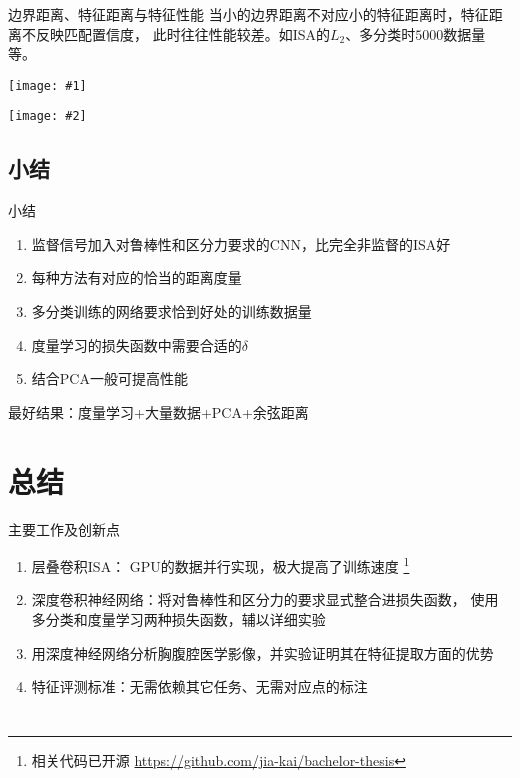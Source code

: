 \documentclass {beamer}
\newcommand{\addtwocolplot}[2]{\centering
    \begin{minipage}{0.49\textwidth}
        \centering
        \texttt{[image: \#1]}
    \end{minipage}
    \begin{minipage}{0.49\textwidth}
        \centering
        \texttt{[image: \#2]}
    \end{minipage}
}
\begin{document}
\begin{frame}{边界距离、特征距离与特征性能}
    当小的边界距离不对应小的特征距离时，特征距离不反映匹配置信度，
    此时往往性能较差。如ISA的$L_2$、多分类时$5000$数据量等。

    \vspace{1em}
    \addtwocolplot{res/expr/border-dist-stat/l2.pdf}
        {res/expr/border-dist-stat/cos.pdf}
\end{frame}

\subsection{小结}
\begin{frame}{小结}
    \begin{enumerate}
        \item 监督信号加入对鲁棒性和区分力要求的CNN，比完全非监督的ISA好
        \item 每种方法有对应的恰当的距离度量
        \item 多分类训练的网络要求恰到好处的训练数据量
        \item 度量学习的损失函数中需要合适的$\delta$
        \item 结合PCA一般可提高性能
    \end{enumerate}
    最好结果：度量学习+大量数据+PCA+余弦距离
\end{frame}

\section{总结}
\begin{frame}{主要工作及创新点}
    \begin{enumerate}
        \item 层叠卷积ISA：
            GPU的数据并行实现，极大提高了训练速度
            \footnote{相关代码已开源
                \url{https://github.com/jia-kai/bachelor-thesis}}
        \item 深度卷积神经网络：将对鲁棒性和区分力的要求显式整合进损失函数，
            使用多分类和度量学习两种损失函数，辅以详细实验
        \item 用深度神经网络分析胸腹腔医学影像，并实验证明其在特征提取方面的优势
        \item 特征评测标准：无需依赖其它任务、无需对应点的标注
    \end{enumerate}
\end{frame}

\section{ }
\end{document}
